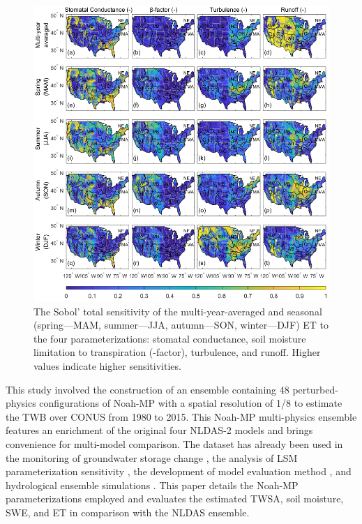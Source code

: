 \documentclass[essd, manuscript]{copernicus}
\begin{document}
\begin{figure}[t]
  \includegraphics[width=12cm]{fig/fig14.pdf}
  \caption{The Sobol' total sensitivity of the multi-year-averaged and seasonal (spring---MAM, summer---JJA, autumn---SON, winter---DJF) ET to the four parameterizations: stomatal conductance, soil moisture limitation to transpiration (\beta{}-factor), turbulence, and runoff. Higher values indicate higher sensitivities.}
  \label{fig:et:sens}
\end{figure}

\label{sec:availability}

\conclusions{}\label{sec:conclusions}

This study involved the construction of an ensemble containing 48 perturbed-physics configurations of Noah-MP with a spatial resolution of 1/8\degree{} to estimate the TWB over CONUS from 1980 to 2015. This Noah-MP multi-physics ensemble features an enrichment of the original four NLDAS-2 models and brings convenience for multi-model comparison. The dataset has already been used in the monitoring of groundwater storage change \citep{rateb2020WRR}, the analysis of LSM parameterization sensitivity \citep{zheng2019WRR}, the development of model evaluation method \citep{zheng2020JAMES}, and hydrological ensemble simulations \citep{fei2021WRR}. This paper details the Noah-MP parameterizations employed and evaluates the estimated TWSA, soil moisture, SWE, and ET in comparison with the NLDAS ensemble.
\end{document}
